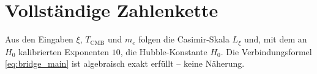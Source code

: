 \section{Vollständige Zahlenkette}
\label{sec:zahlen}

\begin{table}[H]
    \centering
    \caption{Numerische Verifikation der vollständigen Kette}
    \label{tab:numerical}
\end{table}

\begin{foundation}
    Aus den Eingaben $\xi$, $T_\text{CMB}$ und $m_e$ folgen die Casimir-Skala
    $L_\xi$ und, mit dem an $H_0$ kalibrierten Exponenten $10$, die
    Hubble-Konstante $H_0$. Die Verbindungsformel \eqref{eq:bridge_main}
    ist algebraisch exakt erfüllt -- keine Näherung.
\end{foundation}

